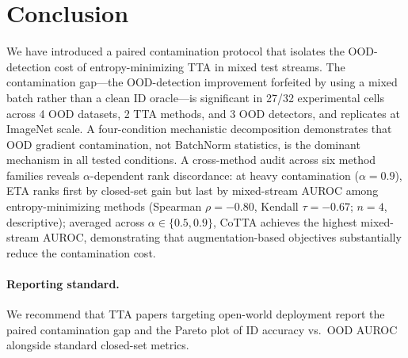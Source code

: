 \section{Conclusion}
\label{sec:conclusion}

We have introduced a paired contamination protocol that isolates the OOD-detection cost of entropy-minimizing TTA in mixed test streams.
The contamination gap---the OOD-detection improvement forfeited by using a mixed batch rather than a clean ID oracle---is significant in 27/32 experimental cells across 4 OOD datasets, 2 TTA methods, and 3 OOD detectors, and replicates at ImageNet scale.
A four-condition mechanistic decomposition demonstrates that OOD gradient contamination, not BatchNorm statistics, is the dominant mechanism in all tested conditions.
A cross-method audit across six method families reveals $\alpha$-dependent rank discordance: at heavy contamination ($\alpha{=}0.9$), ETA ranks first by closed-set gain but last by mixed-stream AUROC among entropy-minimizing methods (Spearman $\rho = -0.80$, Kendall $\tau = -0.67$; $n{=}4$, descriptive); averaged across $\alpha\in\{0.5,0.9\}$, CoTTA achieves the highest mixed-stream AUROC, demonstrating that augmentation-based objectives substantially reduce the contamination cost.

\paragraph{Reporting standard.}
We recommend that TTA papers targeting open-world deployment report the paired contamination gap and the Pareto plot of ID accuracy vs.\ OOD AUROC alongside standard closed-set metrics.

